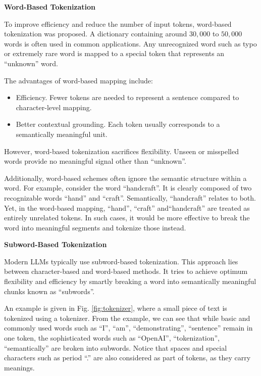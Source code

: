 \vspace{0.1in}
\noindent \textbf{Word-Based Tokenization}
\vspace{0.1in}

To improve efficiency and reduce the number of input tokens, word-based tokenization was proposed. A dictionary containing around $30{,}000$ to $50{,}000$ words is often used in common applications. Any unrecognized word such as typo or extremely rare word is mapped to a special token that represents an ``unknown'' word.

The advantages of word-based mapping include:
\begin{itemize}
	\item Efficiency. Fewer tokens are needed to represent a sentence compared to character-level mapping.
	\item Better contextual grounding. Each token usually corresponds to a semantically meaningful unit.
\end{itemize}

However, word-based tokenization sacrifices flexibility. Unseen or misspelled words provide no meaningful signal other than ``unknown''. 

Additionally, word-based schemes often ignore the semantic structure within a word. For example, consider the word ``handcraft''. It is clearly composed of two recognizable words ``hand'' and ``craft''. Semantically, ``handcraft'' relates to both. Yet, in the word-based mapping, ``hand'', ``craft'' and``handcraft'' are treated as entirely unrelated tokens. In such cases, it would be more effective to break the word into meaningful segments and tokenize those instead.

\vspace{0.1in}
\noindent \textbf{Subword-Based Tokenization}
\vspace{0.1in}

Modern LLMs typically use subword-based tokenization. This approach lies between character-based and word-based methods. It tries to achieve optimum flexibility and efficiency by smartly breaking a word into semantically meaningful chunks known as ``subwords''.

An example is given in Fig. \ref{fig:tokenizer}, where a small piece of text is tokenized using a tokenizer. From the example, we can see that while basic and commonly used words such as ``I'', ``am'', ``demonstrating'', ``sentence'' remain in one token, the sophisticated words such as ``OpenAI'', ``tokenization'', ``semantically'' are broken into subwords. Notice that spaces and special characters such as period ``.'' are also considered as part of tokens, as they carry meanings.

